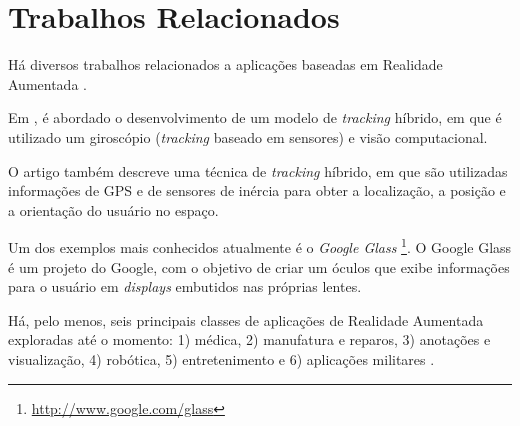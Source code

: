 \section{Trabalhos Relacionados}
\label{sec:trab_relacionados}



Há diversos trabalhos relacionados a aplicações baseadas em Realidade
Aumentada \cite{MOOAR_Study}. 


Em \cite{HybridTrackingOutdoorAR}, é abordado o desenvolvimento de um modelo de \textit{tracking}
híbrido, em que é utilizado um giroscópio (\textit{tracking} baseado em sensores)
e visão computacional.


O artigo \cite{HybridTrackingForGIS} também descreve uma técnica de \textit{tracking} híbrido,
em que são utilizadas informações de \gls{GPS} e de sensores de inércia para obter a localização,
a posição e a orientação do usuário no espaço.


Um dos exemplos mais conhecidos atualmente é o \textit{Google Glass}
\footnote{\href{http://www.google.com/glass}{http://www.google.com/glass}}.
O Google Glass é um projeto do Google, com o objetivo de criar um óculos que exibe
informações para o usuário em \textit{displays} embutidos nas próprias lentes.

% 
% 




Há, pelo menos, seis principais classes de aplicações de 
Realidade Aumentada exploradas até o momento: 1) médica, 2) manufatura e reparos,
3) anotações e visualização, 4) robótica, 5) entretenimento e 6) aplicações militares \cite{SurveyAR}.


